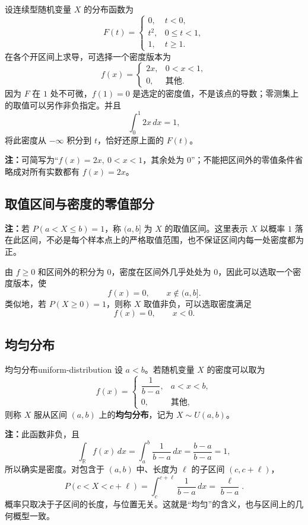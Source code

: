 \begin{example}[由分布函数求密度]
设连续型随机变量 $X$ 的分布函数为
\[
F(t)=
\begin{cases}
0,&t<0,\\
t^2,&0\leq t<1,\\
1,&t\geq1.
\end{cases}
\]
在各个开区间上求导，可选择一个密度版本为
\[
f(x)=
\begin{cases}
2x,&0<x<1,\\
0,&\text{其他}.
\end{cases}
\]
因为 $F$ 在 $1$ 处不可微，$f(1)=0$ 是选定的密度值，不是该点的导数；零测集上的取值可以另作非负指定。并且
\[
\int_0^1 2x\,dx=1,
\]
将此密度从 $-\infty$ 积分到 $t$，恰好还原上面的 $F(t)$。

\textbf{注：}\quad 可简写为“$f(x)=2x,\ 0<x<1$，其余处为 $0$”；不能把区间外的零值条件省略成对所有实数都有 $f(x)=2x$。
\end{example}

\subsection*{取值区间与密度的零值部分}

\textbf{注：}\quad 若 $P(a<X\leq b)=1$，称 $(a,b]$ 为 $X$ 的取值区间。这里表示 $X$ 以概率 $1$ 落在此区间，不必是每个样本点上的严格取值范围，也不保证区间内每一处密度都为正。

由 $f\geq0$ 和区间外的积分为 $0$，密度在区间外几乎处处为 $0$，因此可以选取一个密度版本，使
\[
f(x)=0,\qquad x\notin(a,b].
\]
类似地，若 $P(X\geq0)=1$，则称 $X$ 取值非负，可以选取密度满足
\[
f(x)=0,\qquad x<0.
\]

\subsection*{均匀分布}

\begin{mydefinition}{均匀分布}{uniform-distribution}
设 $a<b$。若随机变量 $X$ 的密度可以取为
\[
f(x)=
\begin{cases}
\dfrac1{b-a},&a<x<b,\\[0.4em]
0,&\text{其他},
\end{cases}
\]
则称 $X$ 服从区间 $(a,b)$ 上的\textbf{均匀分布}，记为 $X\sim U(a,b)$。
\end{mydefinition}

\textbf{注：}\quad 此函数非负，且
\[
\int_{\mathbb R}f(x)\,dx
=\int_a^b\frac1{b-a}\,dx
=\frac{b-a}{b-a}=1,
\]
所以确实是密度。对包含于 $(a,b)$ 中、长度为 $\ell$ 的子区间 $(c,c+\ell)$，
\[
P(c<X<c+\ell)
=\int_c^{c+\ell}\frac1{b-a}\,dx
=\frac{\ell}{b-a}.
\]
概率只取决于子区间的长度，与位置无关。这就是“均匀”的含义，也与区间上的几何概型一致。

